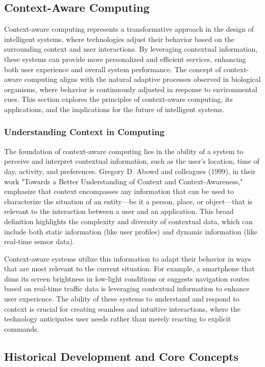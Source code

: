 \documentclass[12pt,twoside]{article}
\begin{document}
\subsection{Context-Aware Computing}

Context-aware computing represents a transformative approach in the design of intelligent systems, where technologies adjust their behavior based on the surrounding context and user interactions. By leveraging contextual information, these systems can provide more personalized and efficient services, enhancing both user experience and overall system performance. The concept of context-aware computing aligns with the natural adaptive processes observed in biological organisms, where behavior is continuously adjusted in response to environmental cues. This section explores the principles of context-aware computing, its applications, and the implications for the future of intelligent systems.

\subsubsection{Understanding Context in Computing}

The foundation of context-aware computing lies in the ability of a system to perceive and interpret contextual information, such as the user's location, time of day, activity, and preferences. Gregory D. Abowd and colleagues (1999), in their work "Towards a Better Understanding of Context and Context-Awareness," emphasize that context encompasses any information that can be used to characterize the situation of an entity—be it a person, place, or object—that is relevant to the interaction between a user and an application. This broad definition highlights the complexity and diversity of contextual data, which can include both static information (like user profiles) and dynamic information (like real-time sensor data).

Context-aware systems utilize this information to adapt their behavior in ways that are most relevant to the current situation. For example, a smartphone that dims its screen brightness in low-light conditions or suggests navigation routes based on real-time traffic data is leveraging contextual information to enhance user experience. The ability of these systems to understand and respond to context is crucial for creating seamless and intuitive interactions, where the technology anticipates user needs rather than merely reacting to explicit commands.

\subsection{Historical Development and Core Concepts}
\end{document}
